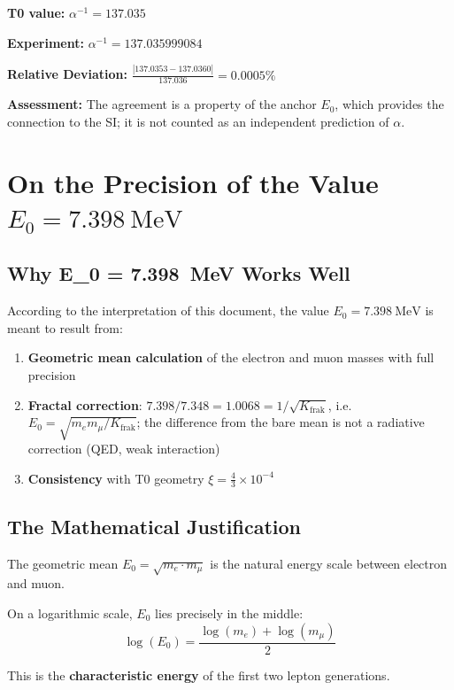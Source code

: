 	\begin{tcolorbox}[colback=green!5!white,colframe=green!75!black,title=Comparison with Experiment]
		\textbf{T0 value:} $\alpha^{-1} = 137.035$
		
		\textbf{Experiment:} $\alpha^{-1} = 137.035999084$
		
		\textbf{Relative Deviation:} $\frac{|137.0353 - 137.0360|}{137.036} = 0.0005\%$
		
		\textbf{Assessment:} The agreement is a property of the anchor $E_0$, which provides the connection to the SI; it is not counted as an independent prediction of $\alpha$.
	\end{tcolorbox}
	
	\section{On the Precision of the Value $E_0 = \SI{7.398}{\MeV}$}
	
	\subsection{Why E\_0 = \SI{7.398}{\MeV} Works Well}
	
	According to the interpretation of this document, the value $E_0 = \SI{7.398}{\MeV}$ is meant to result from:
	
	\begin{enumerate}
		\item \textbf{Geometric mean calculation} of the electron and muon masses with full precision
		\item \textbf{Fractal correction}: $7.398/7.348 = 1.0068 = 1/\sqrt{K_{\text{frak}}}$, i.e.\ $E_0 = \sqrt{m_e m_\mu/K_{\text{frak}}}$; the difference from the bare mean is not a radiative correction (QED, weak interaction)
		\item \textbf{Consistency} with T0 geometry $\xi = \frac{4}{3} \times 10^{-4}$
	\end{enumerate}
	
	\subsection{The Mathematical Justification}
	
	\begin{tcolorbox}[colback=blue!10!white,colframe=blue!75!black,title=Geometric Interpretation]
		The geometric mean $E_0 = \sqrt{m_e \cdot m_\mu}$ is the natural energy scale between electron and muon. 
		
		On a logarithmic scale, $E_0$ lies precisely in the middle:
		\begin{equation}
			\log(E_0) = \frac{\log(m_e) + \log(m_\mu)}{2}
		\end{equation}
		
		This is the \textbf{characteristic energy} of the first two lepton generations.
	\end{tcolorbox}
	
